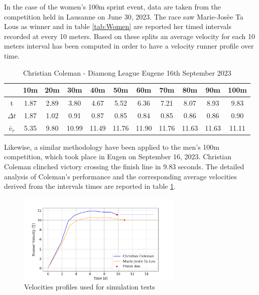 \documentclass[a4paper,12pt,oneside]{book}
\begin{document}
\bigskip
In the case of the women's 100m sprint event, data are taken from the competition held in Lausanne on June 30, 2023.  
The race saw Marie-Josèe Ta Lous as winner and in table \ref{tab:Women} are reported her timed intervals recorded at every 10 meters. 
Based on these splits an average velocity for each 10 meters interval has been computed in order to have a velocity runner profile over time.

\begin{table}[h!]
	\centering
	\begin{adjustbox}{max width=\textwidth}
	\begin{tabular}{c|c|c|c|c|c|c|c|c|c|c}
           & 10m & 20m & 30m & 40m & 50m & 60m & 70m & 80m & 90m &100m \\
	\hline
	\hline
	t & 1.87 & 2.89 & 3.80 & 4.67 & 5.52 & 6.36 & 7.21 & 8.07 & 8.93 & 9.83  \\	
	$\Delta t$ & 1.87 & 1.02 & 0.91 & 0.87 & 0.85 & 0.84 & 0.85 & 0.86 & 0.86 & 0.90 \\
	$\bar{v}_r$ & 5.35 & 9.80 & 10.99 & 11.49 & 11.76 & 11.90 & 11.76 & 11.63 & 11.63 & 11.11 \\
	\hline
	\end{tabular}
	\end{adjustbox}
\caption{Christian Coleman - Diamong League Eugene 16th September 2023}
\label{tab:Man}
\end{table}

Likewise, a similar methodology have been applied to the men's 100m competition, which took place in Eugen on September 16, 2023.
Christian Coleman clinched victory crossing the finish line in 9.83 seconds.
The detailed analysis of Coleman's performance and the corresponding average velocities derived from the intervals times are reported in table \ref{tab:Man}.

\begin{figure}[!h]
	\centering
	\includegraphics[width=0.7\textwidth]{Test_Velocities.png}
\caption{Velocities profiles used for simulation tests}
\label{Test_Velocities}
\end{figure}
\end{document}
